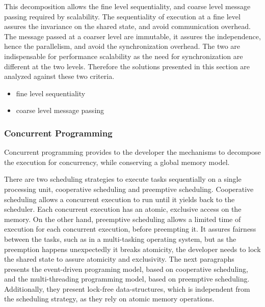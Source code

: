 This decomposition allows the fine level sequentiality, and coarse level message passing required by scalability.
The sequentiality of execution at a fine level assures the invariance on the shared state, and avoid communication overhead.
The message passed at a coarser level are immutable, it assures the independence, hence the parallelism, and avoid the synchronization overhead.
The two are indispensable for performance scalability as the need for synchronization are different at the two levels.
Therefore the solutions presented in this section are analyzed against these two criteria.

\begin{itemize}
\item fine level sequentiality
\item coarse level message passing
\end{itemize}

\subsubsection{Concurrent Programming} \label{chapter3:software-maintainability:concurrency:concurrent-programming}


Concurrent programming provides to the developer the mechanisms to decompose the execution for concurrency, while conserving a global memory model.


There are two scheduling strategies to execute tasks sequentially on a single processing unit, cooperative scheduling and preemptive scheduling.
Cooperative scheduling allows a concurrent execution to run until it yields back to the scheduler.
Each concurrent execution has an atomic, exclusive access on the memory.
On the other hand, preemptive scheduling allows a limited time of execution for each concurrent execution, before preempting it.
It assures fairness between the tasks, such as in a multi-tasking operating system, but as the preemption happens unexpectedly it breaks atomicity, the developer needs to lock the shared state to assure atomicity and exclusivity.
The next paragraphs presents the event-driven programing model, based on cooperative scheduling, and the multi-threading programming model, based on preemptive scheduling.
Additionally, they present lock-free data-structures, which is independent from the scheduling strategy, as they rely on atomic memory operations.

